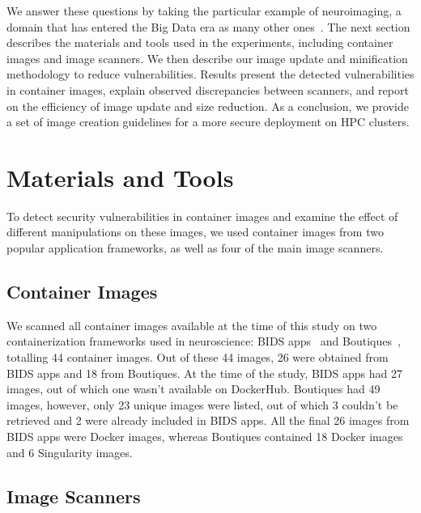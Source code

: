 \documentclass[a4paper,num-refs]{oup-contemporary}
\begin{document}
We answer these questions by taking the particular example of neuroimaging,
a domain that has entered the Big Data era as many other
ones~\cite{van2014human}. The next section describes the materials and
tools used in the experiments, including container images and image
scanners. We then describe our image update and minification methodology to
reduce vulnerabilities. Results present the detected vulnerabilities in
container images, explain observed discrepancies between scanners, and
report on the efficiency of image update and size reduction. As a
conclusion, we provide a set of image creation guidelines for a more secure
deployment on HPC clusters.







\section{Materials and Tools}

To detect security vulnerabilities
in container images and examine the effect of different
manipulations on these images, we used container
images from two popular application frameworks, as well as
four of the main image scanners.

\subsection{Container Images}

We scanned all container images available at the time of this study on two containerization frameworks
used in neuroscience: BIDS
apps~\cite{gorgolewski2017bids} and Boutiques~\cite{glatard2018boutiques},
totalling
44 container images.
Out of these 44 images, 26 were obtained from BIDS apps 
and 18 from Boutiques. At the time of the study, BIDS apps had 27 images,
out of which one wasn't available on DockerHub. Boutiques had 49 images,
however, only 23 unique images were listed, out of which 3 couldn't be retrieved and 2
were already included in BIDS apps. All the final 26 images
from BIDS apps were Docker images, whereas Boutiques contained 18 Docker images
and 6 Singularity images.

\subsection{Image Scanners}
\end{document}
